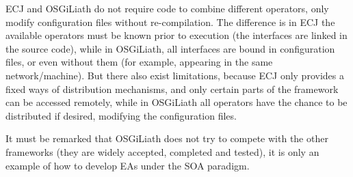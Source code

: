 ECJ and OSGiLiath do not require code to combine different operators, only modify configuration files without re-compilation. The difference is in ECJ the available operators must be known prior to execution (the interfaces are linked in the source code), while in OSGiLiath, all interfaces are bound in configuration files, or even without them (for example, appearing in the same network/machine). But there also exist limitations, because ECJ only provides a fixed ways of distribution mechanisms, and only certain parts of the framework can be accessed remotely, while in OSGiLiath all operators have the chance to be distributed if desired, modifying the configuration files.


It must be remarked that OSGiLiath does not try to compete with the other frameworks (they are widely accepted, completed and tested), it is only an example of how to develop EAs under the SOA paradigm.